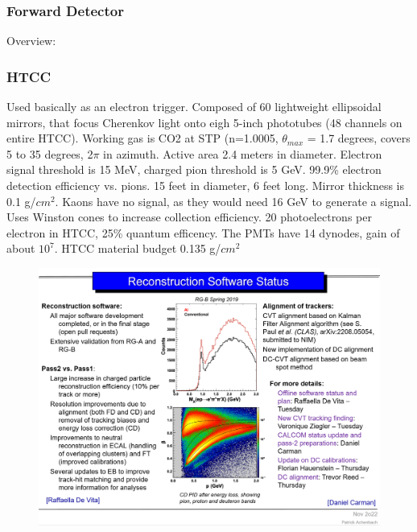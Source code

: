 

\iffalse
    \subsubsection{Forward Detector}
        Overview:
        \subsubsection{HTCC}
            Used basically as an electron trigger. Composed of 60 lightweight ellipsoidal mirrors, that focus Cherenkov light onto eigh 5-inch phototubes (48 channels on entire HTCC). Working gas is CO2 at STP (n=1.0005, $\theta_{max}$ = 1.7 degrees, covers 5 to 35 degrees, 2$\pi$ in azimuth. Active area 2.4 meters in diameter. Electron signal threshold is 15 MeV, charged pion threshold is 5 GeV. 99.9\% electron detection efficiency vs. pions. 15 feet in diameter, 6 feet long. Mirror thickness is 0.1 g/$cm^2$. Kaons have no signal, as they would need 16 GeV to generate a signal. Uses Winston cones to increase collection efficiency. 20 photoelectrons per electron in HTCC, 25\% quantum efficency. The PMTs have 14 dynodes, gain of about $10^7$. HTCC material budget 0.135 g/$cm^2$
            
            									
			 \begin{figure}[H]
    			\centering
    			\includegraphics[width=12cm]{Chapters/Ch2-Experiment/recon_pid/pass2vpass1.png}
			\end{figure}
			
						
									

			
			

